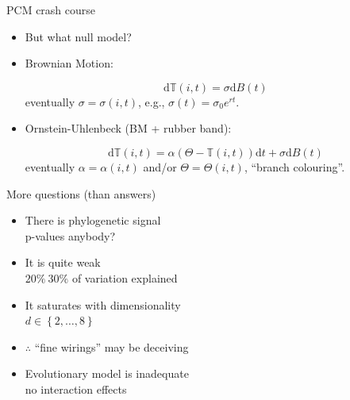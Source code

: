 \documentclass[]{beamer}
\begin{document}
\begin{frame}{PCM crash course}

\centering

\begin{itemize}[<+->]
\itemsep1pt\parskip0pt
\item
But what null model?
\item
Brownian Motion:

\begin{equation*}
\mathrm{d} \mathbb{T}(i,t) = \sigma \mathrm{d}B(t)
\end{equation*}
eventually $\sigma = \sigma(i,t)$, e.g., $\sigma(t) = \sigma_0 e^{rt}$.

\item
Ornstein-Uhlenbeck (BM + rubber band):

\begin{equation*}
\mathrm{d} \mathbb{T}(i,t) = \alpha \left( \Theta -  \mathbb{T}(i,t) \right)\mathrm{d}t  + \sigma \mathrm{d}B(t)
\end{equation*}
eventually $\alpha = \alpha(i,t)$ and/or $\Theta = \Theta(i,t)$, ``branch colouring''.

\end{itemize}

\end{frame}

\begin{frame}{More questions (than answers)}

\begin{itemize}[<+->]
\itemsep1pt\parskip0pt
\item
  There is phylogenetic signal\\
  {\tiny p-values anybody?}
\item
  It is quite weak\\
  {\tiny $20\% ~ 30\%$ of variation explained}
\item
  It saturates with dimensionality\\
  {\tiny $d \in \left\{2, \dots , 8 \right\}$}
\item
  $\therefore$ ``fine wirings'' may be deceiving
\item
  Evolutionary model is inadequate\\
  {\tiny no interaction effects}
\end{itemize}

\end{frame}
\end{document}
